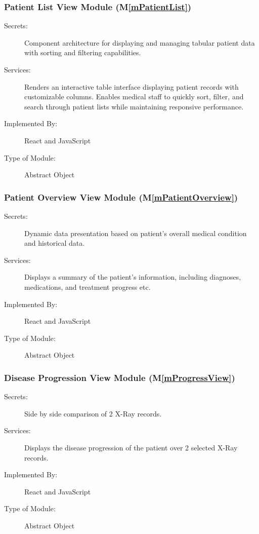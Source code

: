 \documentclass[12pt, titlepage]{article}
\newcommand{\mref}[1]{M\ref{#1}}
\begin{document}
\subsubsection{Patient List View Module (\mref{mPatientList})}
\begin{description}
\item[Secrets:] Component architecture for displaying and managing tabular patient data with sorting and filtering capabilities.
\item[Services:] Renders an interactive table interface displaying patient records with customizable columns. Enables medical staff to quickly sort, filter, and search through patient lists while maintaining responsive performance.
\item[Implemented By:] React and JavaScript
\item[Type of Module:] Abstract Object
\end{description}

\subsubsection{Patient Overview View Module (\mref{mPatientOverview})}
\begin{description}
\item[Secrets:] Dynamic data presentation based on patient's overall medical condition and historical data.
\item[Services:] Displays a summary of the patient's information, including diagnoses, medications, and treatment progress etc.
\item[Implemented By:] React and JavaScript
\item[Type of Module:] Abstract Object
\end{description}

\subsubsection{Disease Progression View Module (\mref{mProgressView})}
\begin{description}
\item[Secrets:] Side by side comparison of 2 X-Ray records.
\item[Services:] Displays the disease progression of the patient over 2 selected X-Ray records.
\item[Implemented By:] React and JavaScript
\item[Type of Module:] Abstract Object
\end{description}
\end{document}
